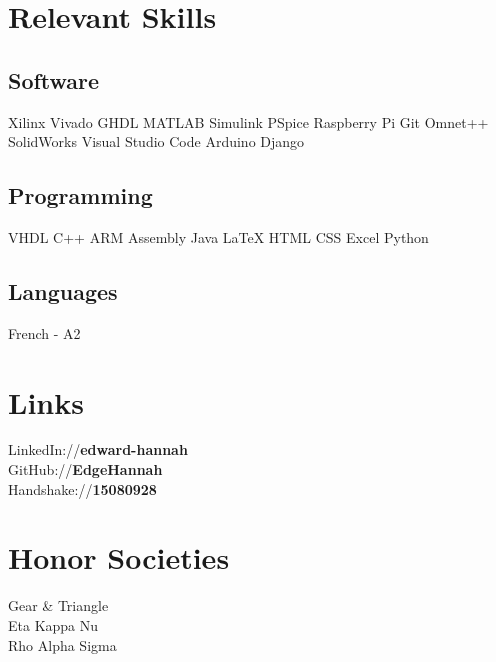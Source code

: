\documentclass[a4paper, 11pt]{article}
\begin{document}
\begin{minipage}[h]{0.33\textwidth}
\section{Relevant Skills}
\subsection{Software\\}
\hspace{-8pt}\textcolor{location}{Xilinx Vivado \textbullet{} GHDL \textbullet{}  MATLAB Simulink \textbullet{} PSpice \textbullet{}  Raspberry Pi \textbullet{} Git \textbullet{} Omnet++ \textbullet{} SolidWorks \textbullet{} Visual Studio Code \textbullet{}  Arduino \textbullet{}  Django}\\

\subsection{Programming\\}
\hspace{-6pt}\textcolor{location}{VHDL \textbullet{} C++ \textbullet{} ARM Assembly \textbullet{} Java \textbullet{} \LaTeX \textbullet{} HTML \textbullet{} CSS \textbullet{} Excel \textbullet{} Python}\\

\subsection{Languages\\}
\hspace{-6pt}\textcolor{location}{French - A2}\\

\section{Links}
LinkedIn://\textbf{\textcolor{date}{edward-hannah}} \\
GitHub://\textbf{\textcolor{date}{EdgeHannah}} \\
Handshake://\textbf{\textcolor{date}{15080928}} \\
\section{Honor Societies}
\textcolor{location}{
Gear \& Triangle\\
Eta Kappa Nu\\
Rho Alpha Sigma\\}
\end{minipage}
\end{document}
